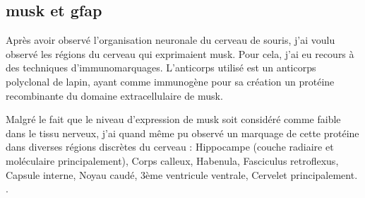 	\begin{figure}[h] %
		\begin{center}
			\begin{subfigure}[h]{0.49\textwidth}
			\end{subfigure}
			\begin{subfigure}[h]{0.49\textwidth}
			\end{subfigure}
			\begin{subfigure}[h]{0.49\textwidth}
			\end{subfigure}
			\begin{subfigure}[h]{0.49\textwidth}
			\end{subfigure}
			\begin{subfigure}[h]{0.49\textwidth}
			\end{subfigure}
		\end{center}
	\end{figure}
	
	\subsection{\acrshort{musk} et \acrshort{gfap}}
	\label{ssec:musk}
	Après avoir observé l'organisation neuronale du cerveau de souris, j'ai voulu observé les régions du cerveau qui exprimaient \gls{musk}. Pour cela, j'ai eu recours à des techniques d'immunomarquages. L'anticorps utilisé est un anticorps polyclonal de lapin, ayant comme immunogène pour sa création un protéine recombinante du domaine extracellulaire de \gls{musk}.
	
	Malgré le fait que le niveau d'expression de \gls{musk} soit considéré comme faible dans le tissu nerveux, j'ai quand même pu observé un marquage de cette protéine dans diverses régions discrètes du cerveau : Hippocampe (couche radiaire et moléculaire principalement), Corps calleux, Habenula, Fasciculus retroflexus, Capsule interne, Noyau caudé, 3ème ventricule ventrale, Cervelet principalement. .
	
	\begin{figure}[h] %
		\begin{center}
			\begin{subfigure}[h]{0.99\textwidth}
			\end{subfigure}
			\begin{subfigure}[h]{0.33\textwidth}
			\end{subfigure}
			\begin{subfigure}[h]{0.33\textwidth}
			\end{subfigure}
			\begin{subfigure}[h]{0.33\textwidth}
			\end{subfigure}
		\end{center}
	\end{figure}
	
